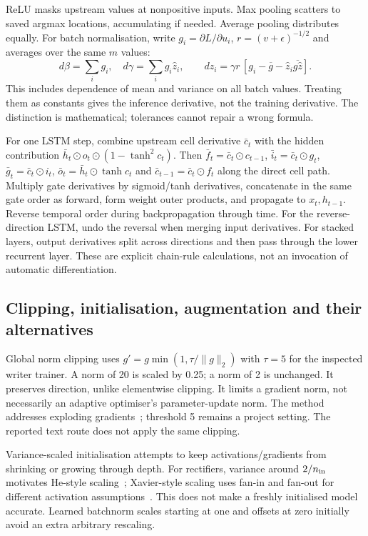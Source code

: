 ReLU masks upstream values at nonpositive inputs. Max pooling scatters to
saved argmax locations, accumulating if needed. Average pooling distributes
equally. For batch normalisation, write $g_i=\partial L/\partial u_i$,
$r=(v+\epsilon)^{-1/2}$ and averages over the same $m$ values:
\[
d\beta=\sum_i g_i,\quad d\gamma=\sum_i g_i\hat z_i,\qquad
dz_i=\gamma r\,[g_i-\overline g-\hat z_i\overline{g\hat z}].
\]
This includes dependence of mean and variance on all batch values. Treating
them as constants gives the inference derivative, not the training derivative.
The distinction is mathematical; tolerances cannot repair a wrong formula.

For one LSTM step, combine upstream cell derivative $\bar c_t$ with the
hidden contribution $\bar h_t\odot o_t\odot(1-\tanh^2c_t)$.
Then $\bar f_t=\bar c_t\odot c_{t-1}$,
$\bar i_t=\bar c_t\odot g_t$,
$\bar g_t=\bar c_t\odot i_t$,
$\bar o_t=\bar h_t\odot\tanh c_t$ and
$\bar c_{t-1}=\bar c_t\odot f_t$ along the direct cell path.
Multiply gate derivatives by sigmoid/tanh derivatives, concatenate in the
same gate order as forward, form weight outer products, and propagate to
$x_t,h_{t-1}$. Reverse temporal order during backpropagation through time.
For the reverse-direction LSTM, undo the reversal when merging input
derivatives. For stacked layers, output derivatives split across directions
and then pass through the lower recurrent layer. These are explicit
chain-rule calculations, not an invocation of automatic differentiation.

\subsection{Clipping, initialisation, augmentation and their alternatives}
Global norm clipping uses
$g'=g\min(1,\tau/\|g\|_2)$ with $\tau=5$ for the inspected writer trainer.
A norm of 20 is scaled by 0.25; a norm of 2 is unchanged. It preserves
direction, unlike elementwise clipping. It limits a gradient norm, not
necessarily an adaptive optimiser's parameter-update norm. The method
addresses exploding gradients~\cite{pascanu2013}; threshold 5 remains a
project setting. The reported text route does not apply the same clipping.

Variance-scaled initialisation attempts to keep activations/gradients from
shrinking or growing through depth. For rectifiers, variance around
$2/n_{\rm in}$ motivates He-style scaling~\cite{he2015}; Xavier-style scaling
uses fan-in and fan-out for different activation assumptions~\cite{glorot2010}.
This does not make a freshly initialised model accurate. Learned batchnorm
scales starting at one and offsets at zero initially avoid an extra arbitrary
rescaling.

